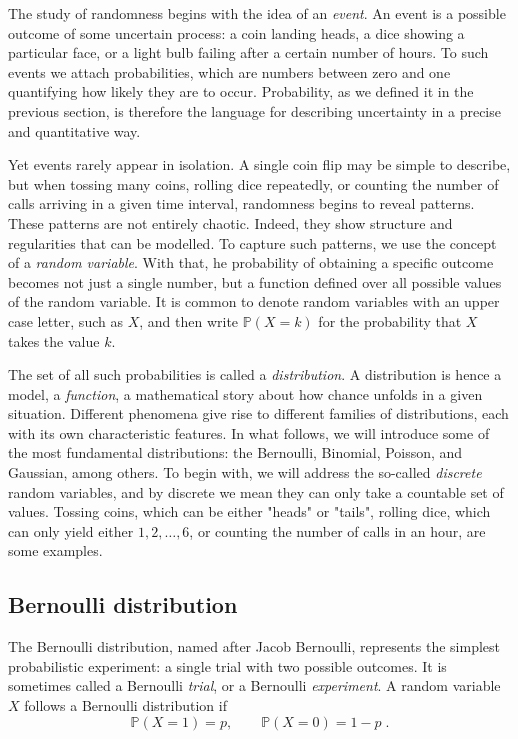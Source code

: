 \documentclass{book}
\begin{document}
The study of randomness begins with the idea of an \textit{event}. An event is a possible outcome of some uncertain process: a coin landing heads, a dice showing a particular face, or a light bulb failing after a certain number of hours. To such events we attach probabilities, which are numbers between zero and one quantifying how likely they are to occur. Probability, as we defined it in the previous section, is therefore the language for describing uncertainty in a precise and quantitative way.

\medskip

Yet events rarely appear in isolation. A single coin flip may be simple to describe, but when tossing many coins, rolling dice repeatedly, or counting the number of calls arriving in a given time interval, randomness begins to reveal patterns. These patterns are not entirely chaotic. Indeed, they show structure and regularities that can be modelled. To capture such patterns, we use the concept of a \textit{random variable}. With that, he probability of obtaining a specific outcome becomes not just a single number, but a function defined over all possible values of the random variable. It is common to denote random variables with an upper case letter, such as $X$, and then write $\mathbb{P}(X = k)$ for the probability that $X$ takes the value $k$.

\medskip

The set of all such probabilities is called a \textit{distribution}. A distribution is hence a model, a \textit{function}, a mathematical story about how chance unfolds in a given situation. Different phenomena give rise to different families of distributions, each with its own characteristic features. In what follows, we will introduce some of the most fundamental distributions: the Bernoulli, Binomial, Poisson, and Gaussian, among others. To begin with, we will address the so-called \textit{discrete} random variables, and by discrete we mean they can only take a countable set of values. Tossing coins, which can be either "heads" or "tails", rolling dice, which can only yield either $1, 2, \dots, 6$, or counting the number of calls in an hour, are some examples.

\medskip

\subsection*{Bernoulli distribution}

The Bernoulli distribution, named after Jacob Bernoulli, represents the simplest probabilistic experiment: a single trial with two possible outcomes. It is sometimes called a Bernoulli \textit{trial}, or a Bernoulli \textit{experiment}. A random variable $X$ follows a Bernoulli distribution if
\begin{equation}
	\mathbb{P}(X = 1) = p, \qquad \mathbb{P}(X = 0) = 1 - p \; .
	\label{eq:bernoulli1}
\end{equation}
\end{document}
